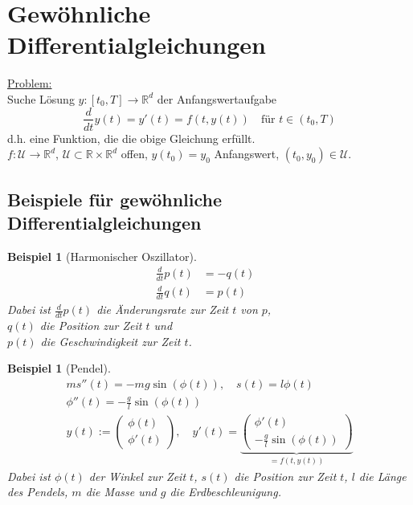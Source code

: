 \documentclass[12pt]{article}
\theoremstyle{break}
\newtheorem{example}[theorem]{Beispiel}
\begin{document}
\section{Gewöhnliche Differentialgleichungen}
\underline{Problem:}\\
Suche Lösung  $y: [t_0, T] \rightarrow \mathbb{R}^d$ der Anfangswertaufgabe
$$\frac{d}{dt} y(t) = y'(t) = f(t, y(t)) \quad \text{für $t \in (t_0, T)$}$$
d.h. eine Funktion, die die obige Gleichung erfüllt. \\
$f: \mathcal{U} \rightarrow \mathbb{R}^d$, $\mathcal{U} \subset \mathbb{R}\times\mathbb{R}^d$ offen, $y(t_0) = y_0$ Anfangswert, $(t_0, y_0) \in \mathcal{U}$.

\subsection{Beispiele für gewöhnliche Differentialgleichungen}
\begin{example}[Harmonischer Oszillator] \leavevmode
\begin{align*}
\frac{d}{dt}p(t) &= -q(t) &\\
\frac{d}{dt}q(t) &= p(t)
\end{align*}
Dabei ist $\frac{d}{dt}p(t)$ die Änderungsrate zur Zeit $t$ von $p$, \\
$q(t)$ die Position zur Zeit $t$ und \\
$p(t)$ die Geschwindigkeit zur Zeit $t$.
\end{example}

\begin{example}[Pendel]
\begin{align*}
&ms''(t) = -mg\sin(\phi(t)), \quad s(t) = l\phi(t) &\\
&\phi''(t) = - \frac{g}{l} \sin(\phi(t)) &\\
&y(t) := \left( \begin{matrix} \phi(t) \\ \phi'(t) \end{matrix} \right), \quad y'(t) = \underbrace{\left( \begin{matrix} \phi'(t) \\ -\frac{g}{l}\sin(\phi(t)) \end{matrix} \right)}_{= f(t, y(t))}
\end{align*}
Dabei ist $\phi(t)$ der Winkel zur Zeit $t$, $s(t)$ die Position zur Zeit $t$, $l$ die Länge des Pendels, $m$ die Masse und $g$ die Erdbeschleunigung.
\end{example}
\end{document}
